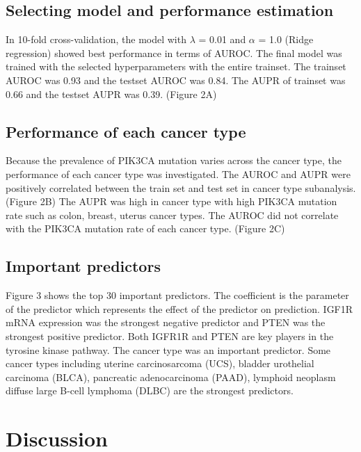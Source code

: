 \documentclass[10pt,letterpaper]{article}
\begin{document}
\hypertarget{selecting-model-and-performance-estimation}{%
\subsection{Selecting model and performance
estimation}\label{selecting-model-and-performance-estimation}}

In 10-fold cross-validation, the model with \(\lambda\) = 0.01 and
\(\alpha\) = 1.0 (Ridge regression) showed best performance in terms of
AUROC. The final model was trained with the selected hyperparameters
with the entire trainset. The trainset AUROC was 0.93 and the testset
AUROC was 0.84. The AUPR of trainset was 0.66 and the testset AUPR was
0.39. (Figure 2A)

\hypertarget{performance-of-each-cancer-type}{%
\subsection{Performance of each cancer
type}\label{performance-of-each-cancer-type}}

Because the prevalence of PIK3CA mutation varies across the cancer type,
the performance of each cancer type was investigated. The AUROC and AUPR
were positively correlated between the train set and test set in cancer
type subanalysis. (Figure 2B) The AUPR was high in cancer type with high
PIK3CA mutation rate such as colon, breast, uterus cancer types. The
AUROC did not correlate with the PIK3CA mutation rate of each cancer
type. (Figure 2C)

\hypertarget{important-predictors}{%
\subsection{Important predictors}\label{important-predictors}}

Figure 3 shows the top 30 important predictors. The coefficient is the
parameter of the predictor which represents the effect of the predictor
on prediction. IGF1R mRNA expression was the strongest negative
predictor and PTEN was the strongest positive predictor. Both IGFR1R and
PTEN are key players in the tyrosine kinase pathway. The cancer type was
an important predictor. Some cancer types including uterine
carcinosarcoma (UCS), bladder urothelial carcinoma (BLCA), pancreatic
adenocarcinoma (PAAD), lymphoid neoplasm diffuse large B-cell lymphoma
(DLBC) are the strongest predictors.

\hypertarget{discussion}{%
\section{Discussion}\label{discussion}}
\end{document}
